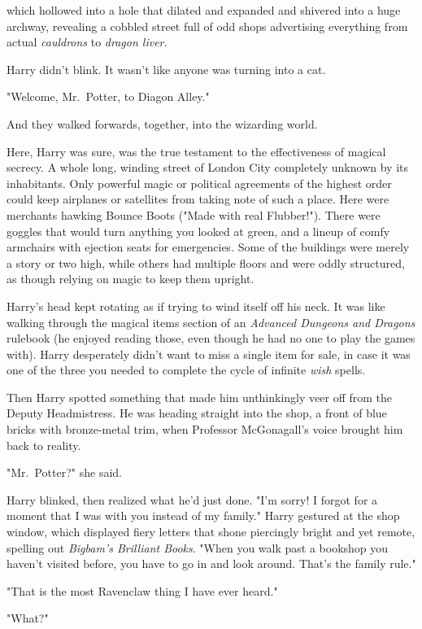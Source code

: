 {\el} which hollowed into a hole that dilated and expanded and
shivered into a huge archway, revealing a cobbled street full of
odd shops advertising everything from actual \emph{cauldrons} to
\emph{dragon liver.}

Harry didn't blink. It wasn't like anyone was turning into a cat.

"Welcome, Mr.~Potter, to Diagon Alley."

And they walked forwards, together, into the wizarding world.

Here, Harry was sure, was the true testament to the
effectiveness of magical secrecy. A whole long, winding
street of London City completely unknown by its
inhabitants. Only powerful magic or political agreements of
the highest order could keep airplanes or satellites from
taking note of such a place. Here were merchants hawking
Bounce Boots ("Made with real Flubber!"). There were
goggles that would turn anything you looked at green, and
a lineup of comfy armchairs with ejection seats for
emergencies. Some of the buildings were merely a story
or two high, while others had multiple floors and were
oddly structured, as though relying on magic to keep them upright.

Harry's head kept rotating as if trying to wind itself off his
neck. It was like walking through the magical items section of an
\emph{Advanced Dungeons and Dragons} rulebook (he enjoyed
reading those, even though he had no one
to play the games with). Harry desperately didn't want to miss a
single item for sale, in case it was one of the three you needed to complete
the cycle of infinite \emph{wish} spells.

Then Harry spotted something that made him unthinkingly
veer off from the Deputy Headmistress.
He was heading straight into the shop, a front of blue bricks
with bronze-metal trim, when Professor McGonagall's voice
brought him back to reality.

"Mr.~Potter?" she said.

Harry blinked, then realized what he'd just done. "I'm sorry! I forgot for a
moment that I was with you instead of my family." Harry gestured at the shop
window, which displayed fiery letters that shone piercingly bright and yet
remote, spelling out \emph{Bigbam's Brilliant Books}. "When you walk past a
bookshop you haven't visited before, you have to go in and look around. That's
the family rule."

"That is the most Ravenclaw thing I have ever heard."

"What?"


